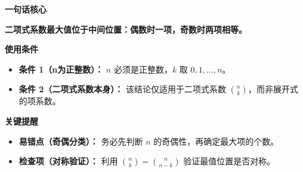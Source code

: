 \begin{summarybox}
	\textbf{\textcolor{CSummary}{一句话核心}}

	\textbf{二项式系数最大值位于中间位置：偶数时一项，奇数时两项相等。}

	\medskip
	\textbf{\textcolor{CSummary}{使用条件}}
	\begin{itemize}[leftmargin=*, itemsep=0.5em, topsep=0.4em]
		\item \textbf{条件 1（n为正整数）：} $n$ 必须是正整数，$k$ 取 $0,1,\dots,n$。
		\item \textbf{条件 2（二项式系数本身）：} 该结论仅适用于二项式系数 $\binom{n}{k}$，而非展开式的项系数。
	\end{itemize}

	\medskip
	\textbf{\textcolor{CSummary}{关键提醒}}
	\begin{itemize}[leftmargin=*, itemsep=0.5em, topsep=0.4em]
		\item \textbf{易错点（奇偶分类）：} 务必先判断 $n$ 的奇偶性，再确定最大项的个数。
		\item \textbf{检查项（对称验证）：} 利用 $\binom{n}{k}=\binom{n}{n-k}$ 验证最值位置是否对称。
	\end{itemize}
\end{summarybox}

